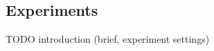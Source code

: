 \subsection{Experiments}
\label{sec:sim-exp} 
TODO introduction (brief, experiment settings) 

 

 

 

 


